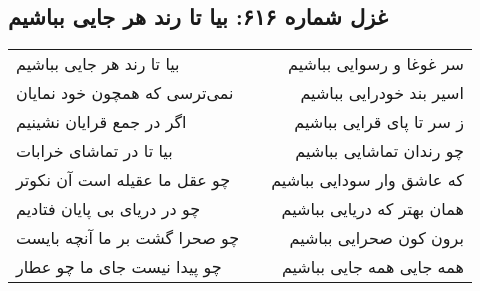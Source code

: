 \begin{center}
\section*{غزل شماره ۶۱۶: بیا تا رند هر جایی بباشیم}
\label{sec:616}
\begin{longtable}{l p{0.5cm} r}
بیا تا رند هر جایی بباشیم
&&
سر غوغا و رسوایی بباشیم
\\
نمی‌ترسی که همچون خود نمایان
&&
اسیر بند خودرایی بباشیم
\\
اگر در جمع قرایان نشینیم
&&
ز سر تا پای قرایی بباشیم
\\
بیا تا در تماشای خرابات
&&
چو رندان تماشایی بباشیم
\\
چو عقل ما عقیله است آن نکوتر
&&
که عاشق وار سودایی بباشیم
\\
چو در دریای بی پایان فتادیم
&&
همان بهتر که دریایی بباشیم
\\
چو صحرا گشت بر ما آنچه بایست
&&
برون کون صحرایی بباشیم
\\
چو پیدا نیست جای ما چو عطار
&&
همه جایی همه جایی بباشیم
\\
\end{longtable}
\end{center}
